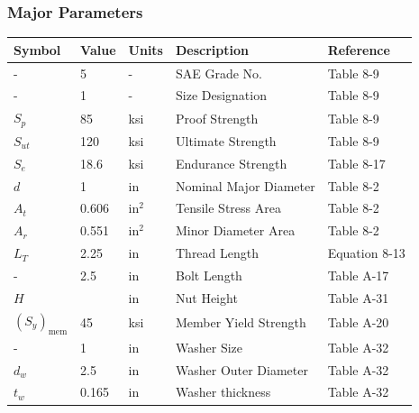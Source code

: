 \documentclass[letterpaper,12pt]{article}
\begin{document}
\subsubsection{Major Parameters}
\begin{center}
	\begin{tabular}{|p{1.5cm}|p{1.5cm}|p{1.5cm}|p{5cm}|p{2.5cm}|}
		\hline
		Symbol & Value & Units & Description & Reference \\
		\hline
		- & 5 & - & SAE Grade No. & Table 8-9\\
		- & 1 & - & Size Designation & Table 8-9\\
		$S_{p}$ & 85 & ksi & Proof Strength & Table 8-9\\
		$S_{ut}$ & 120 & ksi & Ultimate Strength & Table 8-9 \\
		$S_{e}$ & 18.6 & ksi & Endurance Strength & Table 8-17 \\	
		$d$ & 1 & in & Nominal Major Diameter & Table 8-2 \\
		$A_{t}$ & 0.606 & $\text{in}^{2}$ & Tensile Stress Area & Table 8-2 \\
		$A_{r}$ & 0.551 & $\text{in}^{2}$ & Minor Diameter Area & Table 8-2 \\
		$L_{T}$ & 2.25 & in & Thread Length & Equation 8-13 \\
		- & 2.5 & in & Bolt Length & Table A-17\\
		$H$ & \sfrac{55}{64} & in & Nut Height & Table A-31 \\
		$(S_y)_\text{mem}$ & 45 & ksi & Member Yield Strength & Table A-20\\
		- & 1 & in & Washer Size & Table A-32\\
		$d_w$ & 2.5 & in & Washer Outer Diameter & Table A-32\\
		$t_w$ & 0.165 & in & Washer thickness & Table A-32\\
		\hline
	\end{tabular}
\end{center}
\end{document}
